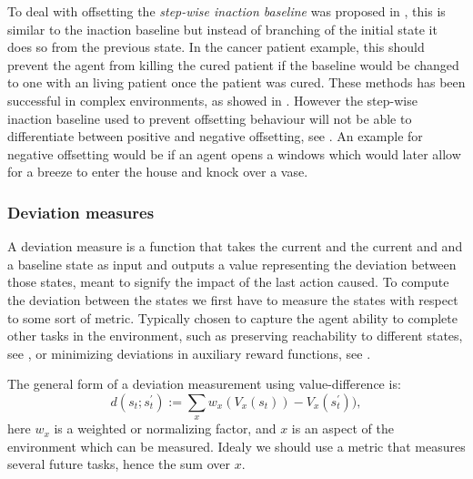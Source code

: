\documentclass[12pt,A4]{report}
\theoremstyle{definition}
\begin{document}
To deal with offsetting the \textit{step-wise inaction baseline} was proposed in \citet{Krakovna19}, this is similar to the inaction baseline but instead of branching of the initial state it does so from the previous state. In the cancer patient example, this should prevent the agent from killing the cured patient if the baseline would be changed to one with an living patient once the patient was cured. These methods has been successful in complex environments, as showed in \citet{Turner20}. However the step-wise inaction baseline used to prevent offsetting behaviour will not be able to differentiate between positive and negative offsetting, see \citet{Krakovna20}. An example for negative offsetting would be if an agent opens a windows which would later allow for a breeze to enter the house and knock over a vase. 


\subsubsection{Deviation measures}
A deviation measure is a function that takes the current and the current and and a baseline state as input and outputs a value representing the deviation between those states, meant to signify the impact of the last action caused. To compute the deviation between the states we first have to measure the states with respect to some sort of metric. Typically chosen to capture the agent ability to complete other tasks in the environment, such as preserving reachability to different states, see \citet{Krakovna19}, or minimizing deviations in auxiliary reward functions, see \citet{Turner19}. 

The general form of a deviation measurement using value-difference is:
  \[d(s_t;s^{\prime}_t) := \sum_x w_x (V_x(s_t)) - V_x(s^{\prime}_t)) ,\]
here $w_x$ is a weighted or normalizing factor, and $x$ is an aspect of the environment which can be measured. Idealy we should use a metric that measures several future tasks, hence the sum over $x$.
\end{document}
